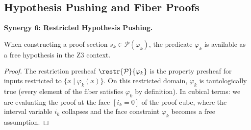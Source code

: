 \subsection{Hypothesis Pushing and Fiber Proofs}

\noindent\textbf{Synergy 6: Restricted Hypothesis Pushing.}

\begin{proposition}
\label{prop:fiber-hypothesis}
When constructing a proof section $s_k \in \mathcal{P}(\varphi_k)$, the
predicate $\varphi_k$ is available as a free hypothesis in the Z3 context.
\end{proposition}

\begin{proof}
The restriction presheaf $\restr{\mathcal{P}}{\varphi_k}$ is the property
presheaf for inputs restricted to $\{x \mid \varphi_k(x)\}$.  On this
restricted domain, $\varphi_k$ is tautologically true (every element of
the fiber satisfies $\varphi_k$ by definition).  In cubical terms: we are
evaluating the proof at the face $[i_k = 0]$ of the proof cube, where
the interval variable $i_k$ collapses and the face constraint $\varphi_k$
becomes a free assumption.
\end{proof}

